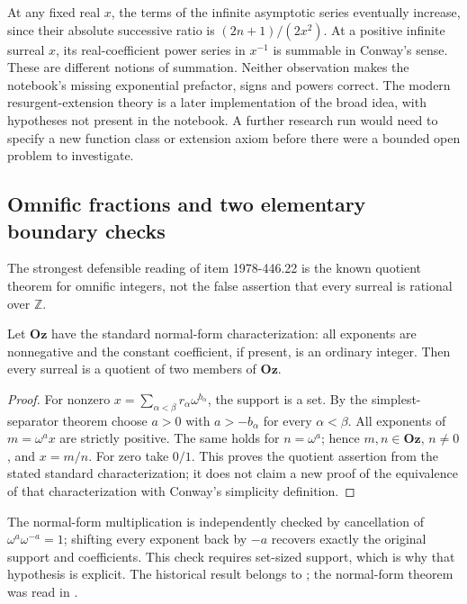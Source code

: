 At any fixed real \(x\), the terms of the infinite asymptotic series eventually increase, since their absolute successive ratio is \((2n+1)/(2x^2)\). At a positive infinite surreal \(x\), its real-coefficient power series in \(x^{-1}\) is summable in Conway's sense. These are different notions of summation. Neither observation makes the notebook's missing exponential prefactor, signs and powers correct. The modern resurgent-extension theory is a later implementation of the broad idea, with hypotheses not present in the notebook. A further research run would need to specify a new function class or extension axiom before there were a bounded open problem to investigate.

\subsection{Omnific fractions and two elementary boundary checks}
The strongest defensible reading of item 1978-446.22 is the known quotient theorem for omnific integers, not the false assertion that every surreal is rational over \(\mathbb Z\).

\begin{proposition}\ours{}
Let \(\mathbf{Oz}\) have the standard normal-form characterization: all exponents are nonnegative and the constant coefficient, if present, is an ordinary integer. Then every surreal is a quotient of two members of \(\mathbf{Oz}\).
\end{proposition}
\begin{proof}
For nonzero \(x=\sum_{\alpha<\beta}r_\alpha\omega^{b_\alpha}\), the support is a set. By the simplest-separator theorem choose \(a>0\) with \(a>-b_\alpha\) for every \(\alpha<\beta\). All exponents of \(m=\omega^a x\) are strictly positive. The same holds for \(n=\omega^a\); hence \(m,n\in\mathbf{Oz}\), \(n\ne0\), and \(x=m/n\). For zero take \(0/1\). This proves the quotient assertion from the stated standard characterization; it does not claim a new proof of the equivalence of that characterization with Conway's simplicity definition.
\end{proof}

The normal-form multiplication is independently checked by cancellation of \(\omega^a\omega^{-a}=1\); shifting every exponent back by \(-a\) recovers exactly the original support and coefficients. This check requires set-sized support, which is why that hypothesis is explicit. The historical result belongs to \citet[Chap.~5]{conway1976numbers}; the normal-form theorem was read in \citet[Thm.~2.4]{kuhlmannmatusinski2015classes}.

